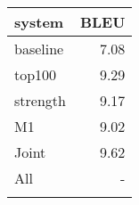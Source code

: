 
\begin{tabular}{lr}
\toprule
system & BLEU \\ 
\toprule
baseline & 7.08 \\
top100 & 9.29 \\
strength & 9.17 \\
M1 & 9.02 \\
Joint & 9.62\\
All & - \\
\bottomrule
\label{table:mawu_results}
\end{tabular}

